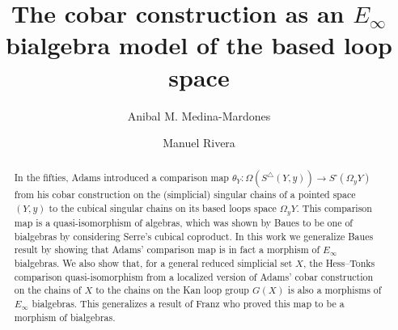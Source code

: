 \documentclass{amsart}
\newcommand{\sS}{S^{\triangle}}
\theoremstyle{definition}
\begin{document}
\title{The cobar construction as an $E_\infty$ bialgebra model of the based loop space}
\author{Anibal M. Medina-Mardones}
\address{Max Plank Institute for Mathematics, Bonn, Germany}
\address{Department of Mathematics, University of Notre Dame, Notre Dame, IN, USA}
\author{Manuel Rivera}
\address{Purdue University}


\begin{abstract}
	In the fifties, Adams introduced a comparison map $\theta_Y \colon \Omega(\sS(Y,y)) \to S^\square(\Omega_y Y)$ from his cobar construction on the (simplicial) singular chains of a pointed space $(Y, y)$ to the cubical singular chains on its based loops space $\Omega_y Y$.
	This comparison map is a quasi-isomorphism of algebras, which was shown by Baues to be one of bialgebras by considering Serre's cubical coproduct.
	In this work we generalize Baues result by showing that Adams' comparison map is in fact a morphism of $E_\infty$ bialgebras.
	We also show that, for a general reduced simplicial set $X$, the Hess--Tonks comparison quasi-isomorphism from a localized version of Adams' cobar construction on the chains of $X$ to the chains on the Kan loop group $G(X)$ is also a morphisms of $E_\infty$ bialgebras.
	This generalizes a result of Franz who proved this map to be a morphism of bialgebras.
\end{abstract}

\vspace*{-1cm}

\maketitle
\setcounter{tocdepth}{1}
\tableofcontents









\end{document}
